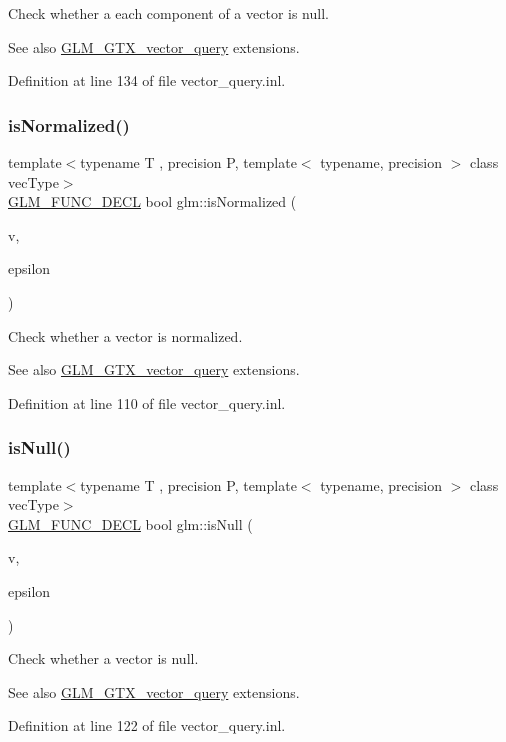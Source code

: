 Check whether a each component of a vector is null. \begin{DoxySeeAlso}{See also}
\mbox{\hyperlink{group__gtx__vector__query}{G\+L\+M\+\_\+\+G\+T\+X\+\_\+vector\+\_\+query}} extensions. 
\end{DoxySeeAlso}


Definition at line 134 of file vector\+\_\+query.\+inl.

\mbox{\label{group__gtx__vector__query_ga6fa5fa2af67d14c205d24c49aad03270}} 
\subsubsection{\texorpdfstring{isNormalized()}{isNormalized()}}
{\footnotesize\ttfamily template$<$typename T , precision P, template$<$ typename, precision $>$ class vec\+Type$>$ \\
\mbox{\hyperlink{setup_8hpp_ab2d052de21a70539923e9bcbf6e83a51}{G\+L\+M\+\_\+\+F\+U\+N\+C\+\_\+\+D\+E\+CL}} bool glm\+::is\+Normalized (\begin{DoxyParamCaption}\item[{vec\+Type$<$ T, P $>$ const \&}]{v,  }\item[{T const \&}]{epsilon }\end{DoxyParamCaption})}

Check whether a vector is normalized. \begin{DoxySeeAlso}{See also}
\mbox{\hyperlink{group__gtx__vector__query}{G\+L\+M\+\_\+\+G\+T\+X\+\_\+vector\+\_\+query}} extensions. 
\end{DoxySeeAlso}


Definition at line 110 of file vector\+\_\+query.\+inl.

\mbox{\label{group__gtx__vector__query_ga81a64edc1a2b470b82896592e89c523b}} 
\subsubsection{\texorpdfstring{isNull()}{isNull()}}
{\footnotesize\ttfamily template$<$typename T , precision P, template$<$ typename, precision $>$ class vec\+Type$>$ \\
\mbox{\hyperlink{setup_8hpp_ab2d052de21a70539923e9bcbf6e83a51}{G\+L\+M\+\_\+\+F\+U\+N\+C\+\_\+\+D\+E\+CL}} bool glm\+::is\+Null (\begin{DoxyParamCaption}\item[{vec\+Type$<$ T, P $>$ const \&}]{v,  }\item[{T const \&}]{epsilon }\end{DoxyParamCaption})}

Check whether a vector is null. \begin{DoxySeeAlso}{See also}
\mbox{\hyperlink{group__gtx__vector__query}{G\+L\+M\+\_\+\+G\+T\+X\+\_\+vector\+\_\+query}} extensions. 
\end{DoxySeeAlso}


Definition at line 122 of file vector\+\_\+query.\+inl.

